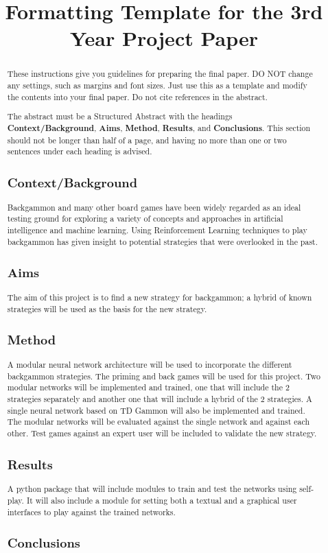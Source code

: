 \documentclass[12pt,a4paper]{article}
\title{Formatting Template for the 3rd Year Project Paper}
\author{} %
\date{}
\begin{document}
\maketitle

\begin{abstract}
These instructions give you guidelines for preparing the final paper.  DO NOT change any settings, such as margins and font sizes.  Just use this as a template and modify the contents into your final paper.  Do not cite references in the abstract.

The abstract must be a Structured Abstract with the headings {\bf Context/Background}, {\bf Aims}, {\bf Method}, {\bf Results}, and {\bf Conclusions}.  This section should not be longer than half of a page, and having no more than one or two sentences under each heading is advised.
\end{abstract}

\begin{abstract}
\subsection{Context/Background}
Backgammon and many other board games have been widely regarded as an ideal testing ground for exploring a variety of concepts and approaches in artificial intelligence and machine learning. Using Reinforcement Learning techniques to play backgammon has given insight to potential strategies that were overlooked in the past.
\subsection{Aims}
The aim of this project is to find a new strategy for backgammon; a hybrid of known strategies will be used as the basis for the new strategy. 
\subsection{Method}
A modular neural network architecture will be used to incorporate the different backgammon strategies. The priming and back games will be used for this project. Two modular networks will be implemented and trained, one that will include the 2 strategies separately and another one that will include a hybrid of the 2 strategies. A single neural network based on TD Gammon will also be implemented and trained. The modular networks will be evaluated against the single network and against each other. Test games against an expert user will be included to validate the new strategy.
\subsection{Results}
A python package that will include modules to train and test the networks using self-play. It will also include a module for setting both a textual and a graphical user interfaces to play against the trained networks. 
\subsection{Conclusions}
\end{abstract}
\end{document}
